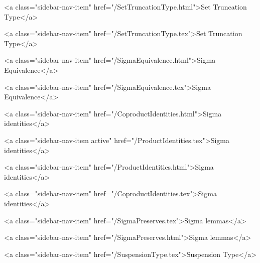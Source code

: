       
        
          <a class="sidebar-nav-item" href="/SetTruncationType.html">Set Truncation Type</a>
        
      
    
      
        
          <a class="sidebar-nav-item" href="/SetTruncationType.tex">Set Truncation Type</a>
        
      
    
      
        
          <a class="sidebar-nav-item" href="/SigmaEquivalence.html">Sigma Equivalence</a>
        
      
    
      
        
          <a class="sidebar-nav-item" href="/SigmaEquivalence.tex">Sigma Equivalence</a>
        
      
    
      
        
          <a class="sidebar-nav-item" href="/CoproductIdentities.html">Sigma identities</a>
        
      
    
      
        
          <a class="sidebar-nav-item active" href="/ProductIdentities.tex">Sigma identities</a>
        
      
    
      
        
          <a class="sidebar-nav-item" href="/ProductIdentities.html">Sigma identities</a>
        
      
    
      
        
          <a class="sidebar-nav-item" href="/CoproductIdentities.tex">Sigma identities</a>
        
      
    
      
        
          <a class="sidebar-nav-item" href="/SigmaPreserves.tex">Sigma lemmas</a>
        
      
    
      
        
          <a class="sidebar-nav-item" href="/SigmaPreserves.html">Sigma lemmas</a>
        
      
    
      
        
          <a class="sidebar-nav-item" href="/SuspensionType.tex">Suspension Type</a>
        
